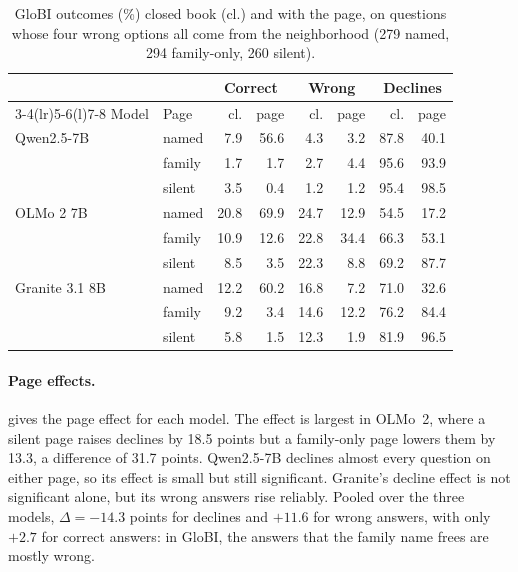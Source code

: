 \begin{table}[t]
\centering
\footnotesize
\setlength{\tabcolsep}{2.4pt}
\begin{tabular}{@{}llrrrrrr@{}}
\toprule
 & & \multicolumn{2}{c}{Correct} & \multicolumn{2}{c}{Wrong} & \multicolumn{2}{c}{Declines} \\
\cmidrule(lr){3-4}\cmidrule(lr){5-6}\cmidrule(l){7-8}
Model & Page & cl. & page & cl. & page & cl. & page \\
\midrule
Qwen2.5-7B & named & 7.9 & 56.6 & 4.3 & 3.2 & 87.8 & 40.1 \\
 & family & 1.7 & 1.7 & 2.7 & 4.4 & 95.6 & 93.9 \\
 & silent & 3.5 & 0.4 & 1.2 & 1.2 & 95.4 & 98.5 \\
OLMo 2 7B & named & 20.8 & 69.9 & 24.7 & 12.9 & 54.5 & 17.2 \\
 & family & 10.9 & 12.6 & 22.8 & 34.4 & 66.3 & 53.1 \\
 & silent & 8.5 & 3.5 & 22.3 & 8.8 & 69.2 & 87.7 \\
Granite 3.1 8B & named & 12.2 & 60.2 & 16.8 & 7.2 & 71.0 & 32.6 \\
 & family & 9.2 & 3.4 & 14.6 & 12.2 & 76.2 & 84.4 \\
 & silent & 5.8 & 1.5 & 12.3 & 1.9 & 81.9 & 96.5 \\
\bottomrule
\end{tabular}
\caption{GloBI outcomes (\%) closed book (cl.) and with the page, on questions whose four wrong options all come from the neighborhood (279 named, 294 family-only, 260 silent).}
\label{tab:globi_models}
\end{table}

\paragraph{Page effects.}
 gives the page effect for each model. The effect is largest in OLMo~2, where a silent page raises declines by 18.5 points but a family-only page lowers them by 13.3, a difference of 31.7 points. Qwen2.5-7B declines almost every question on either page, so its effect is small but still significant. Granite's decline effect is not significant alone, but its wrong answers rise reliably. Pooled over the three models, $\Delta=-14.3$ points for declines and $+11.6$ for wrong answers, with only $+2.7$ for correct answers: in GloBI, the answers that the family name frees are mostly wrong.

